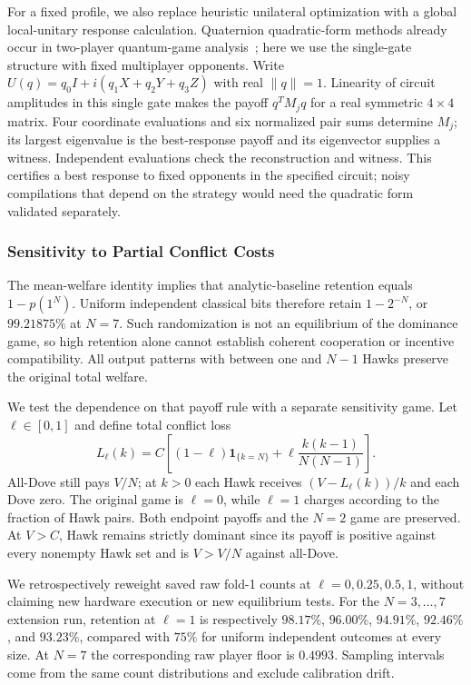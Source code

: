 For a fixed profile, we also replace heuristic unilateral optimization
with a global local-unitary response calculation. Quaternion quadratic-form
methods already occur in two-player quantum-game analysis~\cite{landsburg2011};
here we use the single-gate structure with fixed multiplayer opponents. Write
$U(q)=q_0I+i(q_1X+q_2Y+q_3Z)$ with real $\|q\|=1$.
Linearity of circuit amplitudes in this single gate makes the payoff
$q^TM_jq$ for a real symmetric $4\times4$ matrix. Four coordinate
evaluations and six normalized pair sums determine $M_j$; its largest
eigenvalue is the best-response payoff and its eigenvector supplies a
witness. Independent evaluations check the reconstruction and witness.
This certifies a best response to fixed opponents in the specified
circuit; noisy compilations that depend on the strategy would need the
quadratic form validated separately.

\subsubsection{Sensitivity to Partial Conflict Costs}\label{sec:payoff-sensitivity}
The mean-welfare identity implies that analytic-baseline retention equals
$1-p(1^N)$. Uniform independent classical bits therefore retain
$1-2^{-N}$, or $99.21875\%$ at $N=7$. Such randomization is not an
equilibrium of the dominance game, so high retention alone cannot establish
coherent cooperation or incentive compatibility. All output patterns with between one and
$N-1$ Hawks preserve the original total welfare.

We test the dependence on that payoff rule with a separate sensitivity
game. Let $\ell\in[0,1]$ and define total conflict loss
\begin{equation}
L_\ell(k)=C\left[(1-\ell)\mathbf1_{\{k=N\}}
+\ell\frac{k(k-1)}{N(N-1)}\right].
\label{eq:partial-conflict-loss}
\end{equation}
All-Dove still pays $V/N$; at $k>0$ each Hawk receives
$(V-L_\ell(k))/k$ and each Dove zero. The original game is $\ell=0$,
while $\ell=1$ charges according to the fraction of Hawk pairs. Both
endpoint payoffs and the $N=2$ game are preserved. At $V>C$, Hawk remains
strictly dominant since its payoff is positive against every nonempty
Hawk set and is $V>V/N$ against all-Dove.

We retrospectively reweight saved raw fold-1 counts at
$\ell=0,0.25,0.5,1$, without claiming new hardware execution or new
equilibrium tests. For the $N=3,\ldots,7$ extension run, retention at
$\ell=1$ is respectively $98.17\%$, $96.00\%$, $94.91\%$, $92.46\%$,
and $93.23\%$, compared with $75\%$ for uniform independent outcomes
at every size. At $N=7$ the corresponding raw player floor is $0.4993$.
Sampling intervals come from the same count distributions and exclude
calibration drift.

